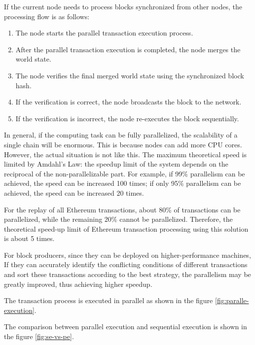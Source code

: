 If the current node needs to process blocks synchronized from other nodes, the processing flow is as follows:

\begin{enumerate}
    \item The node starts the parallel transaction execution process.
    \item After the parallel transaction execution is completed, the node merges the world state.
    \item The node verifies the final merged world state using the synchronized block hash.
    \item If the verification is correct, the node broadcasts the block to the network.
    \item If the verification is incorrect, the node re-executes the block sequentially.
\end{enumerate}

In general, if the computing task can be fully parallelized, the scalability of a single chain will be enormous. This is because nodes can add more CPU cores. However, the actual situation is not like this. The maximum theoretical speed is limited by Amdahl's Law\cite{website:Amdahls-law}: the speedup limit of the system depends on the reciprocal of the non-parallelizable part. For example, if 99\% parallelism can be achieved, the speed can be increased 100 times; if only 95\% parallelism can be achieved, the speed can be increased 20 times.

For the replay of all Ethereum transactions, about 80\% of transactions can be parallelized, while the remaining 20\% cannot be parallelized. Therefore, the theoretical speed-up limit of Ethereum transaction processing using this solution is about 5 times.

For block producers, since they can be deployed on higher-performance machines, If they can accurately identify the conflicting conditions of different transactions and sort these transactions according to the best strategy, the parallelism may be greatly improved, thus achieving higher speedup.

The transaction process is executed in parallel as shown in the figure \ref{fig:paralle-execution}.

The comparison between parallel execution and sequential execution is shown in the figure \ref{fig:se-vs-pe}.


